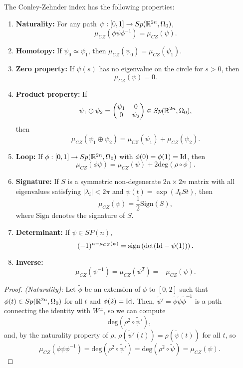 \begin{prop} \label{conleyzehnderproperties} The Conley-Zehnder index has the following properties:
\begin{enumerate}
	\item {\bf Naturality:} For any path $\psi : [0,1] \rightarrow Sp(\mathbb{R}^{2n},\Omega_0)$,
	\[\mu_{CZ}(\phi \psi \phi^{-1}) = \mu_{CZ}(\psi) .\]
	\item {\bf Homotopy:} If $\psi_0 \simeq \psi_1$, then $\mu_{CZ}(\psi_0) = \mu_{CZ}(\psi_1)$.
	\item {\bf Zero property:} If $\psi(s)$ has no eigenvalue on the circle for $s > 0$, then
	\[\mu_{CZ}(\psi) = 0 .\]
	\item {\bf Product property:} If
	\[\psi_1 \oplus \psi_2 = \begin{pmatrix} \psi_1 & 0 \\ 0 & \psi_2 \end{pmatrix} \in Sp(\mathbb{R}^{2n},\Omega_0),\]
	then
	\[\mu_{CZ}(\psi_1 \oplus \psi_2) = \mu_{CZ}(\psi_1) + \mu_{CZ}(\psi_2) .\]
	\item {\bf Loop:} If $\phi : [0,1] \rightarrow Sp(\mathbb{R}^{2n},\Omega_0)$ with $\phi(0) = \phi(1) = \text{Id}$, then
	\[\mu_{CZ}(\phi \psi) = \mu_{CZ}(\psi) + 2 \text{deg}(\rho \circ \phi) .\]
	\item {\bf Signature:} If $S$ is a symmetric non-degenerate $2n \times 2n$ matrix with all eigenvalues satisfying $|\lambda_i| < 2\pi$ and $\psi(t) = \exp(J_0St)$, then
	\[\mu_{CZ}(\psi) = \frac12 \text{Sign}(S),\]
	where $\text{Sign}$ denotes the signature of $S$.
	\item {\bf Determinant:} If $\psi \in SP(n)$,
	\[(-1)^{n-\mu_{CZ}(\psi)} = \text{sign} \left( \text{det}(\text{Id} - \psi(1)) \right) .\]
	\item {\bf Inverse:}
	\[\mu_{CZ}(\psi^{-1}) = \mu_{CZ}(\psi^T) = - \mu_{CZ}(\psi) .\]
\end{enumerate}
\end{prop}

\begin{proof} {\it (Naturality):} Let $\widetilde{\phi}$ be an extension of $\phi$ to $[0,2]$ such that $\phi(t) \in Sp(\mathbb{R}^{2n},\Omega_0)$ for all $t$ and $\phi(2) = \text{Id}$. Then, $\widetilde{\psi}' = \widetilde{\phi} \widetilde{\psi} \widetilde{\phi}^{-1}$ is a path connecting the identity with $W^{\pm}$, so we can compute
\[\text{deg}(\rho^2 \circ \widetilde{\psi}'),\]
and, by the naturality property of $\rho$, $\rho(\widetilde{\psi}'(t)) = \rho(\widetilde{\psi}(t))$ for all $t$, so
\[\mu_{CZ}(\phi\psi\phi^{-1}) = \text{deg}(\rho^2 \circ \widetilde{\psi}') = \text{deg}(\rho^2 \circ \widetilde{\psi}) = \mu_{CZ}(\psi) .\]
\end{proof}

